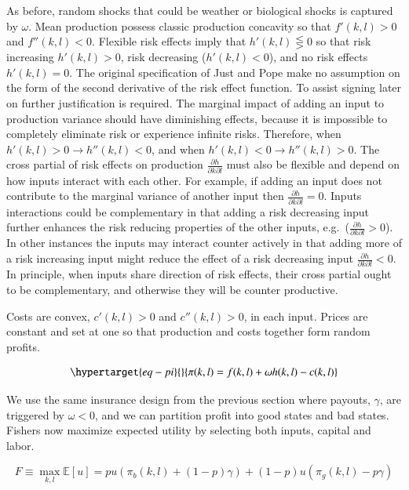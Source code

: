 \documentclass[
  super,
  preprint,
  3p]{elsarticle}
\theoremstyle{plain}
\theoremstyle{plain}
\theoremstyle{remark}
\begin{document}
As before, random shocks that could be weather or biological shocks is
captured by \(\omega\). Mean production possess classic production
concavity so that \(f'(k,l)>0\) and \(f''(k,l)<0\). Flexible risk
effects imply that \(h'(k,l)\lesseqgtr0\) so that risk increasing
\(h'(k,l)>0\), risk decreasing (\(h'(k,l)<0\)), and no risk effects
\(h'(k,l)=0\). The original specification of Just and Pope make no
assumption on the form of the second derivative of the risk effect
function. To assist signing later on further justification is required.
The marginal impact of adding an input to production variance should
have diminishing effects, because it is impossible to completely
eliminate risk or experience infinite risks. Therefore, when
\(h'(k,l)>0 \rightarrow h''(k,l)<0\), and when
\(h'(k,l)<0 \rightarrow h''(k,l)>0\). The cross partial of risk effects
on production \(\frac{\partial h}{\partial k \partial l}\) must also be
flexible and depend on how inputs interact with each other. For example,
if adding an input does not contribute to the marginal variance of
another input then \(\frac{\partial h}{\partial k \partial l}=0\).
Inputs interactions could be complementary in that adding a risk
decreasing input further enhances the risk reducing properties of the
other inputs, e.g.~(\(\frac{\partial h}{\partial k \partial l}>0\)). In
other instances the inputs may interact counter actively in that adding
more of a risk increasing input might reduce the effect of a risk
decreasing input \(\frac{\partial h}{\partial k \partial l}<0\). In
principle, when inputs share direction of risk effects, their cross
partial ought to be complementary, and otherwise they will be counter
productive.

Costs are convex, \(c'(k,l)>0\) and \(c''(k,l)>0\), in each input.
Prices are constant and set at one so that production and costs together
form random profits.

\begin{equation}\protect\hypertarget{eq-pi}{}{
\pi(k,l)=f(k,l)+\omega h(k,l)-c(k,l)
}\label{eq-pi}\end{equation}

We use the same insurance design from the previous section where
payouts, \(\gamma\), are triggered by \(\omega<0\), and we can partition
profit into good states and bad states. Fishers now maximize expected
utility by selecting both inputs, capital and labor.

\[
F\equiv\max_{k,l}\mathbb{E}[u]=pu(\pi_b(k,l)+(1-p)\gamma)+(1-p)u(\pi_g(k,l)-p\gamma)
\]
\end{document}
